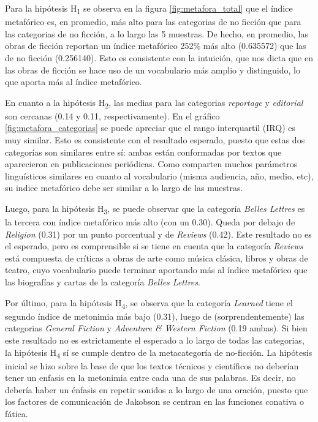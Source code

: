 \documentclass[12pt,letterpaper,twoside]{article}
\begin{document}
Para la hipótesis H\textsubscript{1} se observa en la figura
\ref{fig:metafora_total} que el índice metafórico es, en promedio, más
alto para las categorias de no ficción que para las categorias de no
ficción, a lo largo las 5 muestras. De hecho, en promedio, las obras
de ficción reportan un índice metafórico 252\% más alto (0.635572) que
las de no ficción (0.256140). Esto es consistente con la intuición,
que nos dicta que en las obras de ficción se hace uso de un
vocabulario más amplio y distinguido, lo que aporta más al índice
metafórico.

En cuanto a la hipótesis H\textsubscript{2}, las medias para las categorias
\emph{reportage} y \emph{editorial} son cercanas (0.14 y 0.11,
respectivamente). En el gráfico \ref{fig:metafora_categorias} se puede
apreciar que el rango interquartil (IRQ) es muy similar. Esto es
consistente con el resultado esperado, puesto que estas dos categorías
son similares entre sí: ambas están conformadas por textos que
aparecieron en publicaciones periódicas. Como comparten muchos
parámetros linguísticos similares en cuanto al vocabulario (misma
audiencia, año, medio, etc), su indice metafórico debe ser similar a
lo largo de las muestras.

Luego, para la hipótesis H\textsubscript{3}, se puede observar que la categoría
\emph{Belles Lettres} es la tercera con índice metafórico más alto
(con un 0.30). Queda por debajo de \emph{Religion} (0.31) por un punto porcentual y de
\emph{Reviews} (0.42). Este resultado no es el esperado, pero es
comprensible si se tiene en cuenta que la categoría \emph{Reviews} está
compuesta de críticas a obras de arte como música clásica, libros y
obras de teatro, cuyo vocabulario puede terminar aportando más al
índice metafórico que las biografías y cartas de la categoría \emph{Belles
Lettres}.

Por último, para la hipótesis H\textsubscript{4}, se observa que la categoría
\emph{Learned} tiene el segundo índice de metonimia más bajo (0.31), luego
de (sorprendentemente) las categorias \emph{General Fiction} y \emph{Adventure \&
Western Fiction} (0.19 ambas). Si bien este resultado no es
estrictamente el esperado a lo largo de todas las categorias, la
hipótesis H\textsubscript{4} sí se cumple dentro de la metacategoría de
no-ficción. La hipótesis inicial se hizo sobre la base de que los
textos técnicos y científicos no deberían tener un enfasis en la
metonimia entre cada una de sus palabras.  Es decir, no debería haber
un énfasis en repetir sonidos a lo largo de una oración, puesto que
los factores de comunicación de Jakobson se centran en las funciones
conativa o fática.
\end{document}

